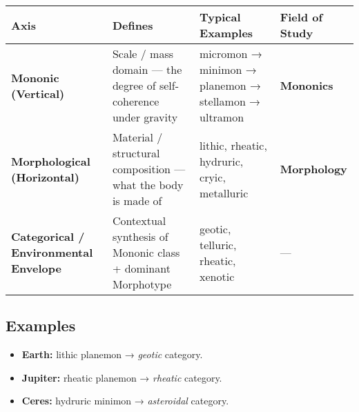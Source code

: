 \documentclass[
  letterpaper,
]{book}
\providecommand{\tightlist}{%
  \setlength{\itemsep}{0pt}\setlength{\parskip}{0pt}}
\begin{document}
\begin{longtable}[]{@{}
  >{\raggedright\arraybackslash}p{}
  >{\raggedright\arraybackslash}p{}
  >{\raggedright\arraybackslash}p{}
  >{\raggedright\arraybackslash}p{}@{}}
\toprule\noalign{}
\begin{minipage}[b]{\linewidth}\raggedright
\textbf{Axis}
\end{minipage} & \begin{minipage}[b]{\linewidth}\raggedright
\textbf{Defines}
\end{minipage} & \begin{minipage}[b]{\linewidth}\raggedright
\textbf{Typical Examples}
\end{minipage} & \begin{minipage}[b]{\linewidth}\raggedright
\textbf{Field of Study}
\end{minipage} \\
\midrule\noalign{}
\endhead
\bottomrule\noalign{}
\endlastfoot
\textbf{Mononic (Vertical)} & Scale / mass domain --- the degree of
self-coherence under gravity & micromon → minimon → planemon → stellamon
→ ultramon & \textbf{Mononics} \\
\textbf{Morphological (Horizontal)} & Material / structural composition
--- what the body is made of & lithic, rheatic, hydruric, cryic,
metalluric & \textbf{Morphology} \\
\textbf{Categorical / Environmental Envelope} & Contextual synthesis of
Mononic class + dominant Morphotype & geotic, telluric, rheatic, xenotic
& --- \\
\end{longtable}

\subsection{Examples}\label{examples}

\begin{itemize}
\tightlist
\item
  \textbf{Earth:} lithic planemon → \emph{geotic} category.\\
\item
  \textbf{Jupiter:} rheatic planemon → \emph{rheatic} category.\\
\item
  \textbf{Ceres:} hydruric minimon → \emph{asteroidal} category.
\end{itemize}
\end{document}
